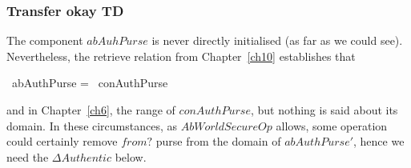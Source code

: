 

%
%

\subsubsection{Transfer okay TD}

The component $abAuhPurse$ is never directly initialised (as far as we could see).
Nevertheless, the retrieve relation from Chapter~\ref{ch10} establishes that
\begin{gzed}
 \dom~abAuthPurse = \dom~conAuthPurse
\end{gzed}
and in Chapter~\ref{ch6}, the range of $conAuthPurse$, but nothing is said about
its domain. In these circumstances, as $AbWorldSecureOp$ allows, some operation could
certainly remove $from?$ purse from the domain of $abAuthPurse'$, hence we need the
$\Delta Authentic$ below.

